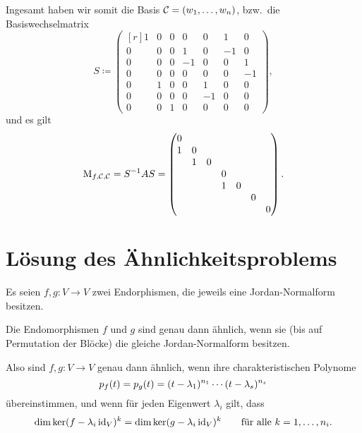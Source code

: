 \begin{example}
  Ingesamt haben wir somit die Basis $\mathcal{C} = (w_1, \dotsc, w_n)$, bzw.\ die Basiswechselmatrix
  \[
              S
    \coloneqq \begin{pmatrix*}[r]
                1 & 0 & 0 &  0  &  0  &  1  &  0  \\
                0 & 0 & 0 &  1  &  0  & -1  &  0  \\
                0 & 0 & 0 & -1  &  0  &  0  &  1  \\
                0 & 0 & 0 &  0  &  0  &  0  & -1  \\
                0 & 1 & 0 &  0  &  1  &  0  &  0  \\
                0 & 0 & 0 &  0  & -1  &  0  &  0  \\
                0 & 0 & 1 &  0  &  0  &  0  &  0
              \end{pmatrix*},
  \]
  und es gilt
  \[
      \operatorname{M}_{f, \mathcal{C}, \mathcal{C}}
    = S^{-1} A S
    = \begin{pmatrix}
        0 &   &   &   &   &   &   \\
        1 & 0 &   &   &   &   &   \\
          & 1 & 0 &   &   &   &   \\
          &   &   & 0 &   &   &   \\
          &   &   & 1 & 0 &   &   \\
          &   &   &   &   & 0 &   \\
          &   &   &   &   &   & 0
      \end{pmatrix}.
  \]
\end{example}





\section{Lösung des Ähnlichkeitsproblems}

Es seien $f, g \colon V \to V$ zwei Endorphismen, die jeweils eine Jordan-Normalform besitzen.

\begin{theorem}
  Die Endomorphismen $f$ und $g$ sind genau dann ähnlich, wenn sie \textup(bis auf Permutation der Blöcke\textup) die gleiche Jordan-Normalform besitzen.
\end{theorem}

Also sind $f, g \colon V \to V$ genau dann ähnlich, wenn ihre charakteristischen Polynome
\[
    p_{f}(t)
  = p_{g}(t)
  = (t - \lambda_1)^{n_1} \dotsm (t - \lambda_s)^{n_s}
\]
übereinstimmen, und wenn für jeden Eigenwert $\lambda_i$ gilt, dass
\[
    \dim \ker (f - \lambda_i \operatorname{id}_V)^k
  = \dim \ker (g - \lambda_i \operatorname{id}_V)^k
  \qquad
  \text{für alle $k = 1, \dotsc, n_i$}.
\]

